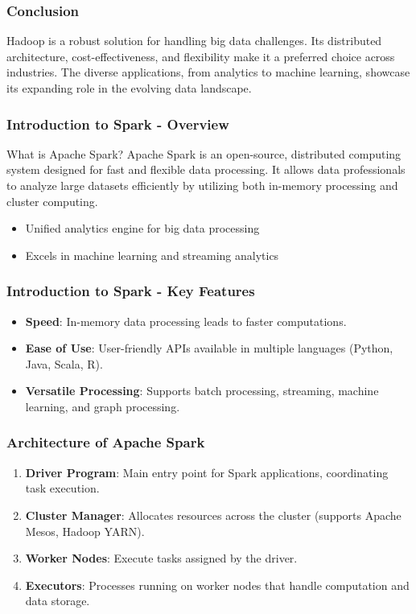 \documentclass[aspectratio=169]{beamer}
\begin{document}
\begin{frame}[fragile]
    \frametitle{Conclusion}
    Hadoop is a robust solution for handling big data challenges. Its distributed architecture, cost-effectiveness, and flexibility make it a preferred choice across industries. The diverse applications, from analytics to machine learning, showcase its expanding role in the evolving data landscape.
\end{frame}

\begin{frame}[fragile]
    \frametitle{Introduction to Spark - Overview}
    \begin{block}{What is Apache Spark?}
        Apache Spark is an open-source, distributed computing system designed for fast and flexible data processing. It allows data professionals to analyze large datasets efficiently by utilizing both in-memory processing and cluster computing.
    \end{block}
    
    \begin{itemize}
        \item Unified analytics engine for big data processing
        \item Excels in machine learning and streaming analytics
    \end{itemize}
\end{frame}

\begin{frame}[fragile]
    \frametitle{Introduction to Spark - Key Features}
    \begin{itemize}
        \item \textbf{Speed}: In-memory data processing leads to faster computations.
        \item \textbf{Ease of Use}: User-friendly APIs available in multiple languages (Python, Java, Scala, R).
        \item \textbf{Versatile Processing}: Supports batch processing, streaming, machine learning, and graph processing.
    \end{itemize}
\end{frame}

\begin{frame}[fragile]
    \frametitle{Architecture of Apache Spark}
    \begin{enumerate}
        \item \textbf{Driver Program}: Main entry point for Spark applications, coordinating task execution.
        \item \textbf{Cluster Manager}: Allocates resources across the cluster (supports Apache Mesos, Hadoop YARN).
        \item \textbf{Worker Nodes}: Execute tasks assigned by the driver.
        \item \textbf{Executors}: Processes running on worker nodes that handle computation and data storage.
    \end{enumerate}
\end{frame}
\end{document}
